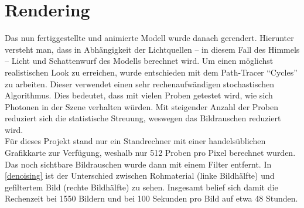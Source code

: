\section{Rendering}
\label{sec:rendering}

Das nun fertiggestellte und animierte Modell wurde danach gerendert. Hierunter versteht man, dass in Abhängigkeit der Lichtquellen -- in diesem Fall des Himmels -- Licht und Schattenwurf des Modells berechnet wird. Um einen möglichst realistischen Look zu erreichen, wurde entschieden mit dem Path-Tracer ``Cycles'' zu arbeiten. Dieser verwendet einen sehr rechenaufwändigen stochastischen Algorithmus. Dies bedeutet, dass mit vielen Proben getestet wird, wie sich Photonen in der Szene verhalten würden. Mit steigender Anzahl der Proben reduziert sich die statistische Streuung, weswegen das Bildrauschen reduziert wird. \\
Für dieses Projekt stand nur ein Standrechner mit einer handelsüblichen Grafikkarte zur Verfügung, weshalb nur 512 Proben pro Pixel berechnet wurden. Das noch sichtbare Bildrauschen wurde dann mit einem Filter entfernt. In \autoref{denoising} ist der Unterschied zwischen Rohmaterial (linke Bildhälfte) und gefiltertem Bild (rechte Bildhälfte) zu sehen. Insgesamt belief sich damit die Rechenzeit bei 1550 Bildern und bei 100 Sekunden pro Bild auf etwa 48 Stunden.

